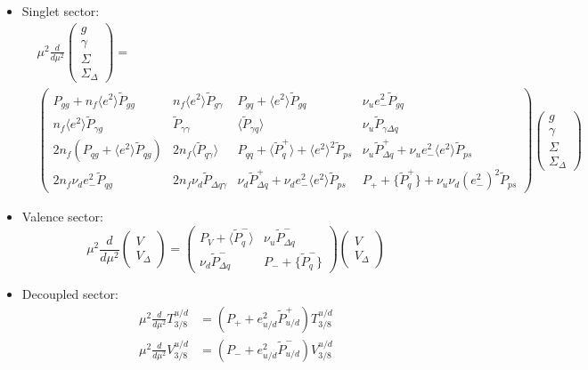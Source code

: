\documentclass[a4paper,oneside]{article}
\begin{document}
\begin{itemize}
\item Singlet sector:
\begin{align*}
&\mu^2\frac{d}{d\mu^2}
\begin{pmatrix}
g \\
\gamma \\
\Sigma \\
\Sigma_\Delta
\end{pmatrix}
= \\
&\begin{pmatrix}
 P_{gg}+n_f \langle e^2\rangle \tilde{P}_{gg} & n_f \langle e^2\rangle \tilde{P}_{g\gamma} & P_{gq} + \langle e^2\rangle \tilde{P}_{gq} & \nu_ue^2_-\tilde{P}_{gq} \\
 n_f \langle e^2\rangle \tilde{P}_{\gamma g} & \tilde{P}_{\gamma \gamma} &  \langle \tilde{P}_{\gamma q} \rangle& \nu_u \tilde{P}_{\gamma \Delta q} \\
 2n_f (P_{qg} +\langle e^2\rangle  \tilde{P}_{qg} )& 2 n_f  \langle \tilde{P}_{q \gamma} \rangle& P_{qq}+  \langle \tilde{P}^+_{q} \rangle+ \langle e^2\rangle^2\tilde{P}_{ps}& \nu_u\tilde{P}^+_{ \Delta q}+ \nu_ue_-^2\langle e^2\rangle \tilde{P}_{ps}\\
 2n_f \nu_d e^2_-\tilde{P}_{qg} & 2n_f \nu_d \tilde{P}_{\Delta q\gamma} & \nu_d\tilde{P}^+_{ \Delta q}+  \nu_d e^2_-\langle e^2\rangle \tilde{P}_{ps}& P_+ + \{ \tilde{P}^+_{q} \}+\nu_u \nu_d (e^2_-)^2\tilde{P}_{ps}
\end{pmatrix}
\begin{pmatrix}
g \\
\gamma \\
\Sigma \\
\Sigma_\Delta
\end{pmatrix}
\end{align*}

\item Valence sector:
\begin{equation*}
\mu^2\frac{d}{d\mu^2}
\begin{pmatrix}
V \\
V_\Delta
\end{pmatrix}
=
\begin{pmatrix}
P_V+\langle \tilde{P}^-_{q} \rangle & \nu_u\tilde{P}^-_{\Delta q}\\
 \nu_d\tilde{P}^-_{\Delta q}& P_-+\{ \tilde{P}^-_{q} \}
\end{pmatrix}
\begin{pmatrix}
V \\
V_\Delta
\end{pmatrix}
\end{equation*}
\item Decoupled sector:
\begin{align*}
\mu^2\frac{d}{d\mu^2}T^{u/d}_{3/8} & = (P_{+} + e_{u/d}^2 \tilde{P}^{+}_{u/d}) T^{u/d}_{3/8} \\
\mu^2\frac{d}{d\mu^2}V^{u/d}_{3/8} & = (P_{-} + e_{u/d}^2 \tilde{P}^{-}_{u/d} )V^{u/d}_{3/8}
\end{align*}
\end{itemize}
\end{document}
